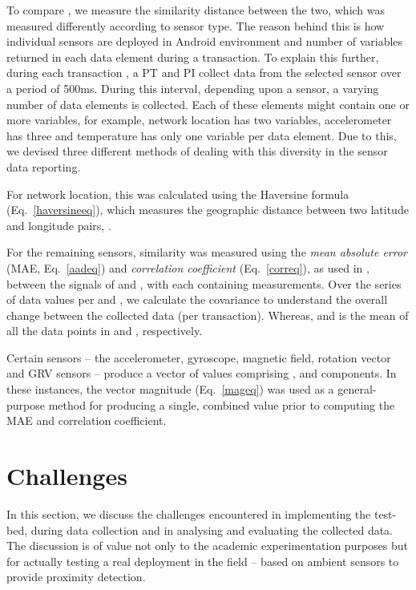 \documentclass{article}
\begin{document}
To compare , we measure the similarity distance between the two, which was measured differently according to sensor type. The reason behind this is how individual sensors are deployed in Android environment and number of variables returned in each data element during a transaction. To explain this further, during each transaction , a PT and PI collect data from the selected sensor over a period of 500ms. During this interval, depending upon a sensor, a varying number of data elements is collected.  Each of these elements might contain one or more variables, for example, network location has two variables, accelerometer has three and temperature has only one variable per data element. Due to this, we devised three different methods of dealing with this diversity in the sensor data reporting.    
 
For network location, this was calculated using the Haversine formula (Eq.\ \ref{haversineeq}), which measures the geographic distance between two latitude and longitude pairs, .

For the remaining sensors, similarity was measured using the \emph{mean absolute error} (MAE, Eq.\ \ref{aadeq}) and \emph{correlation coefficient} (Eq.\ \ref{correq}), as used in \cite{mehrnezhad2014tap}, between the signals of  and , with each containing  measurements. Over the series of  data values per  and , we calculate the covariance to understand the overall change between the collected data (per transaction). Whereas,  and  is the mean of all the data points in  and , respectively.

Certain sensors -- the accelerometer, gyroscope, magnetic field, rotation vector and GRV sensors -- produce a vector of values comprising ,  and  components. In these instances, the vector magnitude (Eq.\ \ref{mageq}) was used as a general-purpose method for producing a single, combined value prior to computing the MAE and correlation coefficient.

\section{Challenges}
\label{sec:ExperimentationandChallenges}

In this section, we discuss the challenges encountered in implementing the test-bed, during data collection and in analysing and evaluating the collected data. The discussion is of value not only to the academic experimentation purposes but for actually testing a real deployment in the field -- based on ambient sensors to provide proximity detection. 
\end{document}
